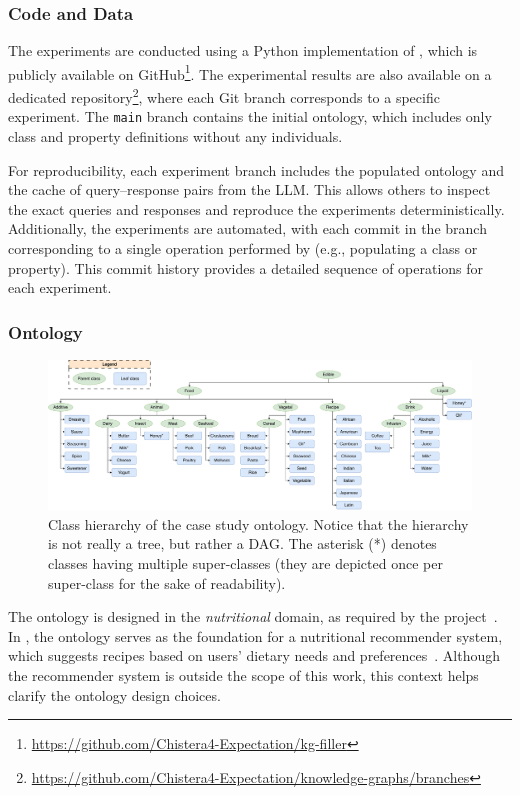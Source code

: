 %
\subsubsection{Code and Data}
\label{subsubsec:code-and-data}
%
The experiments are conducted using a Python implementation of \llmfkg{}, which is publicly available on GitHub\footnote{\url{https://github.com/Chistera4-Expectation/kg-filler}}.
%
The experimental results are also available on a dedicated repository\footnote{\url{https://github.com/Chistera4-Expectation/knowledge-graphs/branches}}, where each Git branch corresponds to a specific experiment.
%
The \texttt{main} branch contains the initial ontology, which includes only class and property definitions without any individuals.

%
For reproducibility, each experiment branch includes the populated ontology and the cache of query--response pairs from the \gls{LLM}.
%
This allows others to inspect the exact queries and responses and reproduce the experiments deterministically.
%
Additionally, the experiments are automated, with each commit in the branch corresponding to a single operation performed by \llmfkg{} (e.g., populating a class or property).
%
This commit history provides a detailed sequence of operations for each experiment.

%
\subsubsection{Ontology}
\label{subsubsec:kgfiller-ontology}
%
\begin{figure}
    \centering
    \includegraphics[width=\linewidth]{figures/kgfiller/ontology-skeleton}
    \caption[Class hierarchy of the ontology used in the experiments]{
        Class hierarchy of the case study ontology.
        Notice that the hierarchy is not really a tree, but rather a \gls{DAG}.
        The asterisk (*) denotes classes having multiple super-classes (they are depicted once per super-class for the sake of readability).
    }
    \label{fig:ontology}
\end{figure}
%
The ontology is designed in the \emph{nutritional} domain, as required by the \expectation{} project~\cite{expectation-extraamas2021}.
%
In \expectation{}, the ontology serves as the foundation for a nutritional recommender system, which suggests recipes based on users' dietary needs and preferences~\cite{DBLP:journals/cmpb/MagniniCCAO23}.
%
Although the recommender system is outside the scope of this work, this context helps clarify the ontology design choices.

